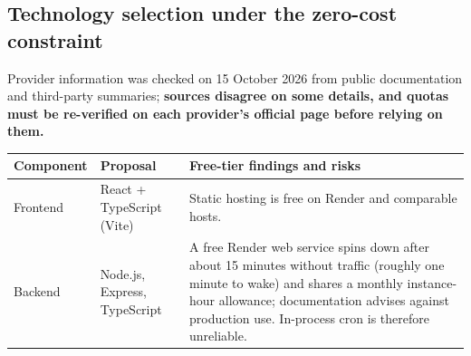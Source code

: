 \documentclass[11pt,a4paper]{article}
\begin{document}
\subsection{Technology selection under the zero-cost constraint}

Provider information was checked on 15 October 2026 from public documentation and third-party summaries; \textbf{sources disagree on some details, and quotas must be re-verified on each provider's official page before relying on them.}

\begin{longtable}{@{}L{2.4cm}L{3.6cm}L{9.8cm}@{}}
	\toprule
	\textbf{Component} & \textbf{Proposal}                                                                                      & \textbf{Free-tier findings and risks}                                                                                                                                                                                                                                                                                                                                                                                                                                                                                  \\
	\midrule
	\endhead
	Frontend           & React + TypeScript (Vite)                                                                              & Static hosting is free on Render and comparable hosts.                                                                                                                                                                                                                                                                                                                                                                                                                                                                 \\
	Backend            & Node.js, Express, TypeScript                                                                           & A free Render web service spins down after about 15 minutes without traffic (roughly one minute to wake) and shares a monthly instance-hour allowance; documentation advises against production use. In-process cron is therefore unreliable.                                                                                                                                                                                                                                                                          \\

\end{longtable}
\end{document}
